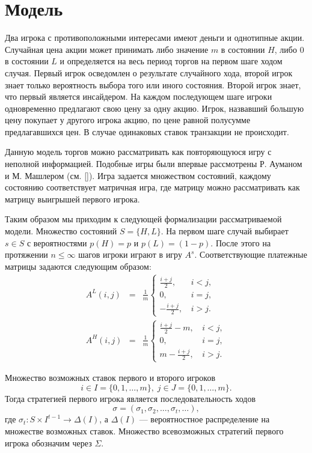 \section{Модель}
Два игрока с противоположными интересами имеют деньги и однотипные акции. Случайная цена акции может принимать либо значение $ m $ в состоянии $ H $, либо $ 0 $ в состоянии $ L $ и определяется на весь период торгов на первом шаге ходом случая. Первый игрок осведомлен о результате случайного хода, второй игрок знает только вероятность выбора того или иного состояния. 
Второй игрок знает, что первый является инсайдером.
На каждом последующем шаге игроки одновременно предлагают свою цену за одну акцию. Игрок, назвавший большую цену покупает у другого игрока акцию, по цене равной полусумме предлагавшихся цен. В случае одинаковых ставок транзакции не происходит.

Данную модель торгов можно рассматривать как повторяющуюся игру с неполной информацией. Подобные игры были впервые рассмотрены Р. Ауманом и М. Машлером (см. [\aumann]). Игра задается множеством состояний, каждому состоянию соответствует матричная игра, где матрицу можно рассматривать как матрицу выигрышей первого игрока.

Таким образом мы приходим к следующей формализации рассматриваемой модели.
Множество состояний $ S = \{H, L\} $. На первом шаге случай выбирает $ s \in S $ с вероятностями $ p(H) = p $ и $ p(L) = (1 - p) $.
После этого на протяжении $ n \leq \infty $ шагов игроки играют в игру $ A^s $.
Соответствующие платежные матрицы задаются следующим образом:
\begin{eqnarray*}
A^L(i, j) &=& \frac{1}{m}\begin{cases}
\frac{i+j}{2}, &\, i < j, \\
0, &\, i = j, \\
-\frac{i+j}{2}, &\, i > j.
\end{cases}
\\
A^H(i, j) &=& \frac{1}{m}\begin{cases}
\frac{i+j}{2} - m, &\, i < j, \\
0, &\, i = j, \\
m - \frac{i+j}{2}, &\, i > j.
\end{cases}
\end{eqnarray*}



Множество возможных ставок первого и второго игроков 
\[
  i \in I = \{0, 1, \ldots, m\}, \;
  j \in J = \{0, 1, \ldots, m\}.
\]
Тогда стратегией первого игрока является последовательность ходов
\[
  \sigma = (\sigma_1, \sigma_2, \ldots, \sigma_t, \ldots),
\]
где $ \sigma_t: S \times I^{t-1} \rightarrow \Delta(I) $, а $ \Delta(I) $ --- вероятностное распределение на множестве возможных ставок. Множество всевозможных стратегий первого игрока обозначим через $ \Sigma $.

